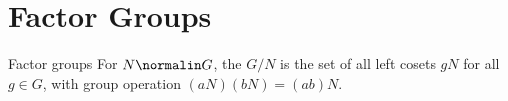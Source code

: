 

        



\section{Factor Groups}

\begin{dfnbox}{Factor groups}{}
    For $N \normalin G$, the  $G/N$ is the set of all left cosets $gN$ for all $g \in G$, with group operation $(aN)(bN) = (ab)N$.
\end{dfnbox}


